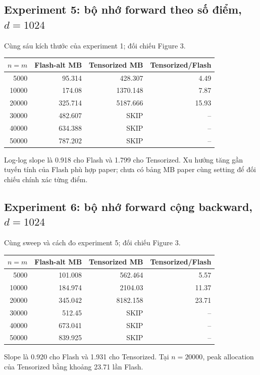 \documentclass[11pt,a4paper]{article}
\newcommand{\SKIP}{\textnormal{SKIP}}
\begin{document}
\subsection{Experiment 5: bộ nhớ forward theo số điểm, $d=1024$}
Cùng sáu kích thước của experiment 1; đối chiếu Figure 3.
\begin{center}\footnotesize
\setlength{\tabcolsep}{5pt}
\begin{tabular}{@{}rrrr@{}}
\toprule
$n=m$ & Flash-alt MB & Tensorized MB & Tensorized/Flash \\
\midrule
5000 & 95.314 & 428.307 & 4.49 \\
10000 & 174.08 & 1370.148 & 7.87 \\
20000 & 325.714 & 5187.666 & 15.93 \\
30000 & 482.607 & \SKIP & -- \\
40000 & 634.388 & \SKIP & -- \\
50000 & 787.202 & \SKIP & -- \\
\bottomrule
\end{tabular}
\end{center}
Log-log slope là 0.918 cho Flash và 1.799 cho Tensorized. Xu hướng tăng
gần tuyến tính của Flash phù hợp paper; chưa có bảng MB paper cùng setting
để đối chiếu chính xác từng điểm.

\subsection{Experiment 6: bộ nhớ forward cộng backward, $d=1024$}
Cùng sweep và cách đo experiment 5; đối chiếu Figure 3.
\begin{center}\footnotesize
\setlength{\tabcolsep}{5pt}
\begin{tabular}{@{}rrrr@{}}
\toprule
$n=m$ & Flash-alt MB & Tensorized MB & Tensorized/Flash \\
\midrule
5000 & 101.008 & 562.464 & 5.57 \\
10000 & 184.974 & 2104.03 & 11.37 \\
20000 & 345.042 & 8182.158 & 23.71 \\
30000 & 512.45 & \SKIP & -- \\
40000 & 673.041 & \SKIP & -- \\
50000 & 839.925 & \SKIP & -- \\
\bottomrule
\end{tabular}
\end{center}
Slope là 0.920 cho Flash và 1.931 cho Tensorized. Tại $n=20000$,
peak allocation của Tensorized bằng khoảng 23.71 lần Flash.
\end{document}
